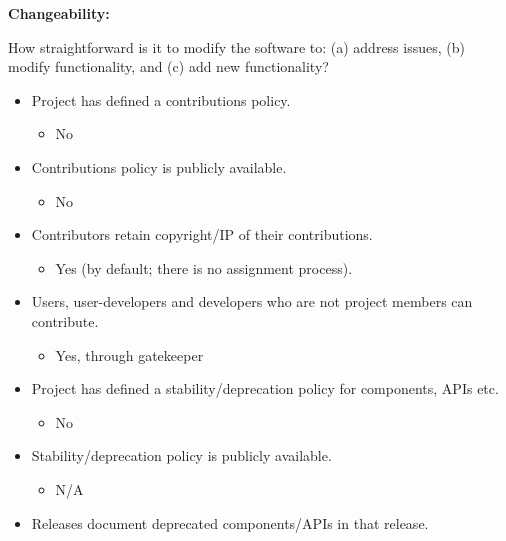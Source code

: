 \textbf{Changeability:}

How straightforward is it to modify the software to: (a) address issues,
(b) modify functionality, and (c) add new functionality?

\begin{itemize}
\itemsep1pt\parskip0pt
\item
  Project has defined a contributions policy.

  \begin{itemize}
  \itemsep1pt\parskip0pt
  \item
    No
  \end{itemize}
\item
  Contributions policy is publicly available.

  \begin{itemize}
  \itemsep1pt\parskip0pt
  \item
    No
  \end{itemize}
\item
  Contributors retain copyright/IP of their contributions.

  \begin{itemize}
  \itemsep1pt\parskip0pt
  \item
    Yes (by default; there is no assignment process).
  \end{itemize}
\item
  Users, user-developers and developers who are not project members can
  contribute.

  \begin{itemize}
  \itemsep1pt\parskip0pt
  \item
    Yes, through gatekeeper
  \end{itemize}
\item
  Project has defined a stability/deprecation policy for components,
  APIs etc.

  \begin{itemize}
  \itemsep1pt\parskip0pt
  \item
    No
  \end{itemize}
\item
  Stability/deprecation policy is publicly available.

  \begin{itemize}
  \itemsep1pt\parskip0pt
  \item
    N/A
  \end{itemize}
\item
  Releases document deprecated components/APIs in that release.


\end{itemize}
